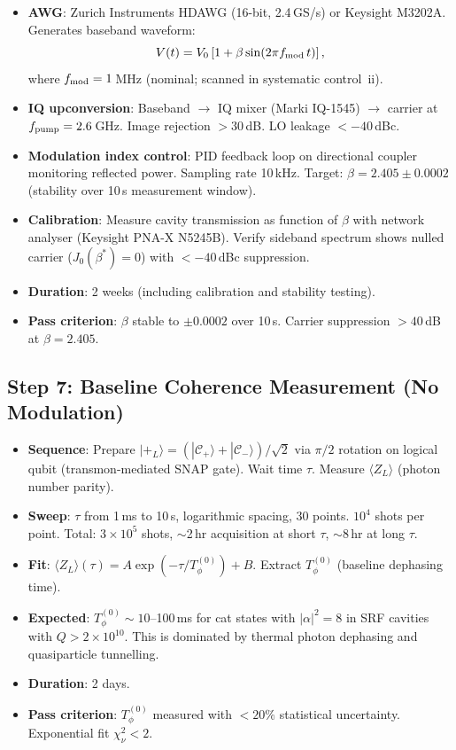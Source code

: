 \documentclass[11pt]{article}
\theoremstyle{definition}
\theoremstyle{remark}
\newcommand{\ee}[1]{\times 10^{#1}}
\begin{document}
\begin{itemize}[nosep]
\item \textbf{AWG}: Zurich Instruments HDAWG (16-bit, 2.4\,GS/s) or
  Keysight M3202A. Generates baseband waveform:
  \begin{equation}
    V(t) = V_0\left[1 + \beta\sin(2\pi f_{\rm mod}\,t)\right],
  \end{equation}
  where $f_{\rm mod} = 1$\,MHz (nominal; scanned in systematic control~ii).
\item \textbf{IQ upconversion}: Baseband $\rightarrow$ IQ mixer
  (Marki IQ-1545) $\rightarrow$ carrier at $f_{\rm pump} = 2.6$\,GHz.
  Image rejection $> 30$\,dB. LO leakage $< -40$\,dBc.
\item \textbf{Modulation index control}: PID feedback loop on directional
  coupler monitoring reflected power. Sampling rate 10\,kHz. Target:
  $\beta = 2.405 \pm 0.0002$ (stability over 10\,s measurement window).
\item \textbf{Calibration}: Measure cavity transmission as function of
  $\beta$ with network analyser (Keysight PNA-X N5245B). Verify sideband
  spectrum shows nulled carrier ($J_0(\beta^*) = 0$) with
  $< -40$\,dBc suppression.
\item \textbf{Duration}: 2 weeks (including calibration and stability
  testing).
\item \textbf{Pass criterion}: $\beta$ stable to $\pm 0.0002$ over
  10\,s. Carrier suppression $> 40$\,dB at $\beta = 2.405$.
\end{itemize}

\subsection{Step 7: Baseline Coherence Measurement (No Modulation)}

\begin{itemize}[nosep]
\item \textbf{Sequence}: Prepare $|+_L\rangle = (|\mathcal{C}_+\rangle +
  |\mathcal{C}_-\rangle)/\sqrt{2}$ via $\pi/2$ rotation on logical qubit
  (transmon-mediated SNAP gate). Wait time $\tau$. Measure
  $\langle Z_L\rangle$ (photon number parity).
\item \textbf{Sweep}: $\tau$ from 1\,ms to 10\,s, logarithmic spacing,
  30 points. $10^4$ shots per point. Total: $3\ee{5}$ shots,
  $\sim$2\,hr acquisition at short $\tau$, $\sim$8\,hr at long $\tau$.
\item \textbf{Fit}: $\langle Z_L\rangle(\tau) = A\exp(-\tau/T_\phi^{(0)}) + B$.
  Extract $T_\phi^{(0)}$ (baseline dephasing time).
\item \textbf{Expected}: $T_\phi^{(0)} \sim 10$--100\,ms for cat states
  with $|\alpha|^2 = 8$ in SRF cavities with $Q > 2\ee{10}$. This is
  dominated by thermal photon dephasing and quasiparticle tunnelling.
\item \textbf{Duration}: 2 days.
\item \textbf{Pass criterion}: $T_\phi^{(0)}$ measured with $< 20\%$
  statistical uncertainty. Exponential fit $\chi^2_\nu < 2$.
\end{itemize}
\end{document}
